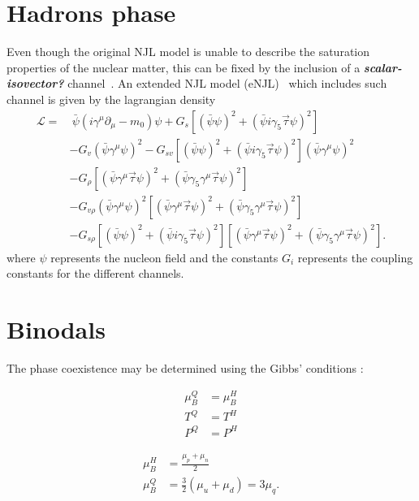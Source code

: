 \documentclass[plainsections,alongposter]{sciposterlocal}
\newcommand{\comment}[1]{{\bf\textit{#1}}}
\begin{document}
\begin{multicols}{2}
\section*{Hadrons phase}
Even though the original NJL model is unable to describe the saturation properties of the nuclear matter, this can be fixed by the inclusion of a \comment{scalar-isovector?} channel~\cite{Koch1987}. An extended NJL model (eNJL)~\cite{Pais2016} which includes such channel is given by the lagrangian density
\begin{equation*}\label{Eq:Lagrangiana_eNLJ_Pais}
\begin{split}
	\mathcal{L} =&~ \bar{\psi}(i\gamma^\mu\partial_\mu - m_0)\psi + G_s[(\bar{\psi}\psi)^2 + (\bar{\psi}i\gamma_5\vec{\tau}\psi)^2] \\
	& - G_v(\bar{\psi}\gamma^\mu\psi)^2 - G_{sv}[(\bar{\psi}\psi)^2 + (\bar{\psi}i\gamma_5\vec{\tau}\psi)^2](\bar{\psi}\gamma^\mu\psi)^2 \\
	& - G_\rho[(\bar{\psi}\gamma^\mu\vec{\tau}\psi)^2 + (\bar{\psi}\gamma_5\gamma^\mu\vec{\tau}\psi)^2] \\
	& - G_{v\rho}(\bar{\psi}\gamma^\mu\psi)^2[(\bar{\psi}\gamma^\mu\vec{\tau}\psi)^2 + (\bar{\psi}\gamma_5\gamma^\mu\vec{\tau}\psi)^2] \\
	& - G_{s\rho} [(\bar{\psi}\psi)^2 + (\bar{\psi}i\gamma_5\vec{\tau}\psi)^2][(\bar{\psi}\gamma^\mu\vec{\tau}\psi)^2 + (\bar{\psi}\gamma_5\gamma^\mu\vec{\tau}\psi)^2].
\end{split}
\end{equation*}
%
where $\psi$ represents the nucleon field and the constants $G_i$ represents the coupling constants for the different channels.

\columnbreak

\section*{Binodals}

The phase coexistence may be determined using the Gibbs' conditions \cite{Cavagnoli2011}:

\begin{minipage}{0.5\columnwidth}
\begin{align*}
\mu_B^Q &= \mu_B^H\\
T^Q &= T^H \\
P^Q &= P^H
\end{align*}
\end{minipage}
\begin{minipage}{0.5\columnwidth}
\begin{align*}
	\mu_B^H &= \frac{\mu_p + \mu_n}{2} \\
	\mu_B^Q &= \frac{3}{2} (\mu_u + \mu_d) = 3 \mu_q.
\end{align*}
\end{minipage}


\end{multicols}
\end{document}
